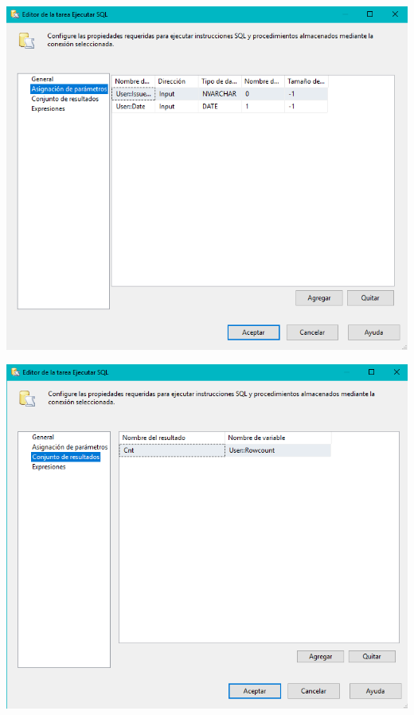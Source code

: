 \begin{itemize}
	\begin{center}
	\includegraphics[width=14cm]{./Imagenes/tarea2_12}
	\end{center}

\begin{center}
	\includegraphics[width=14cm]{./Imagenes/tarea2_13}
	\end{center}


\end{itemize}
